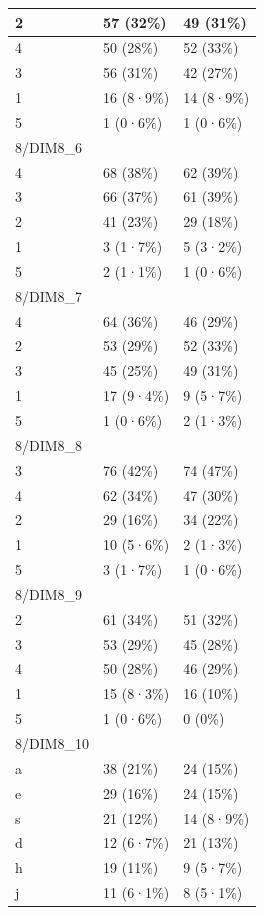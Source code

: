 \documentclass[
]{book}
\begin{document}
\begin{tabular}{l|l|l}
\hline
2 & 57 (32\%) & 49 (31\%)\\
\hline
4 & 50 (28\%) & 52 (33\%)\\
\hline
3 & 56 (31\%) & 42 (27\%)\\
\hline
1 & 16 (8·9\%) & 14 (8·9\%)\\
\hline
5 & 1 (0·6\%) & 1 (0·6\%)\\
\hline
8/DIM8\_6 &  & \\
\hline
4 & 68 (38\%) & 62 (39\%)\\
\hline
3 & 66 (37\%) & 61 (39\%)\\
\hline
2 & 41 (23\%) & 29 (18\%)\\
\hline
1 & 3 (1·7\%) & 5 (3·2\%)\\
\hline
5 & 2 (1·1\%) & 1 (0·6\%)\\
\hline
8/DIM8\_7 &  & \\
\hline
4 & 64 (36\%) & 46 (29\%)\\
\hline
2 & 53 (29\%) & 52 (33\%)\\
\hline
3 & 45 (25\%) & 49 (31\%)\\
\hline
1 & 17 (9·4\%) & 9 (5·7\%)\\
\hline
5 & 1 (0·6\%) & 2 (1·3\%)\\
\hline
8/DIM8\_8 &  & \\
\hline
3 & 76 (42\%) & 74 (47\%)\\
\hline
4 & 62 (34\%) & 47 (30\%)\\
\hline
2 & 29 (16\%) & 34 (22\%)\\
\hline
1 & 10 (5·6\%) & 2 (1·3\%)\\
\hline
5 & 3 (1·7\%) & 1 (0·6\%)\\
\hline
8/DIM8\_9 &  & \\
\hline
2 & 61 (34\%) & 51 (32\%)\\
\hline
3 & 53 (29\%) & 45 (28\%)\\
\hline
4 & 50 (28\%) & 46 (29\%)\\
\hline
1 & 15 (8·3\%) & 16 (10\%)\\
\hline
5 & 1 (0·6\%) & 0 (0\%)\\
\hline
8/DIM8\_10 &  & \\
\hline
a & 38 (21\%) & 24 (15\%)\\
\hline
e & 29 (16\%) & 24 (15\%)\\
\hline
s & 21 (12\%) & 14 (8·9\%)\\
\hline
d & 12 (6·7\%) & 21 (13\%)\\
\hline
h & 19 (11\%) & 9 (5·7\%)\\
\hline
j & 11 (6·1\%) & 8 (5·1\%)\\

\end{tabular}
\end{document}
